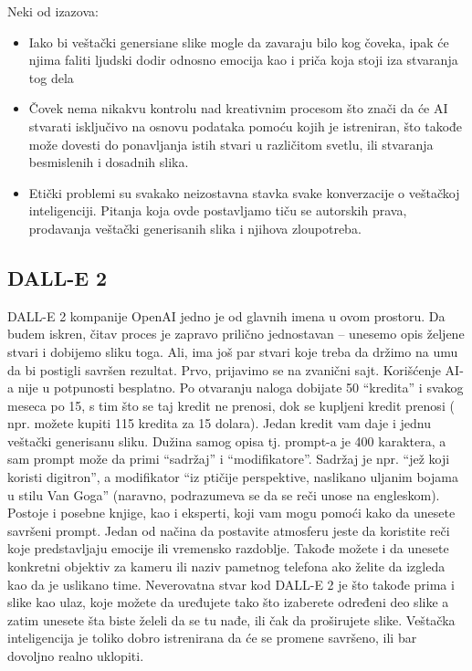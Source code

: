 \documentclass[12pt, letterpaper]{article}
\begin{document}
Neki od izazova:
\begin{itemize}
    \item Iako bi veštački genersiane slike mogle da zavaraju bilo kog čoveka, ipak će njima faliti ljudski dodir odnosno emocija kao i priča koja stoji iza stvaranja tog dela
    \item Čovek nema nikakvu kontrolu nad kreativnim procesom što znači da će AI stvarati isključivo na osnovu podataka pomoću kojih je istreniran, što takođe može dovesti do ponavljanja istih stvari u različitom svetlu, ili stvaranja besmislenih i dosadnih slika.
    \item Etički problemi su svakako neizostavna stavka svake konverzacije o veštačkoj inteligenciji. Pitanja koja ovde postavljamo tiču se autorskih prava, prodavanja veštački generisanih slika i njihova zloupotreba. 
\end{itemize}

\subsection{DALL-E 2}
DALL-E 2 kompanije OpenAI\cite{OpenAI} jedno je od glavnih imena u ovom prostoru. Da budem iskren, čitav proces je zapravo prilično jednostavan – unesemo opis željene stvari i dobijemo sliku toga. Ali, ima još par stvari koje treba da držimo na umu da bi postigli savršen rezultat. Prvo, prijavimo se na zvanični sajt. Korišćenje AI-a nije u potpunosti besplatno. Po otvaranju naloga dobijate 50 “kredita” i svakog meseca po 15, s tim što se taj kredit ne prenosi, dok se kupljeni kredit prenosi ( npr. možete kupiti 115 kredita za 15 dolara). Jedan kredit vam daje i jednu veštački generisanu sliku. Dužina samog opisa tj. prompt-a je 400 karaktera, a sam prompt može da primi “sadržaj” i “modifikatore”. Sadržaj je npr. “jež koji koristi digitron”, a modifikator “iz ptičije perspektive, naslikano uljanim bojama u stilu Van Goga” (naravno, podrazumeva se da se reči unose na engleskom)\cite{Prompt}. Postoje i posebne knjige, kao i eksperti, koji vam mogu pomoći kako da unesete savršeni prompt. Jedan od načina da postavite atmosferu jeste da koristite reči koje predstavljaju emocije ili vremensko razdoblje. Takođe možete i da unesete konkretni objektiv za kameru ili naziv pametnog telefona ako želite da izgleda kao da je uslikano time. Neverovatna stvar kod DALL-E 2 je što takođe prima i slike kao ulaz, koje možete da uređujete tako što izaberete određeni deo slike a zatim unesete šta biste želeli da se tu nađe, ili čak da proširujete slike. Veštačka inteligencija je toliko dobro istrenirana da će se promene savršeno, ili bar dovoljno realno uklopiti. 
\end{document}
